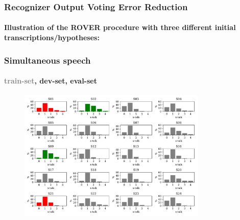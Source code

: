 \documentclass{beamer}
\begin{document}
\begin{frame}
  \frametitle{\textbf{R}ecognizer \textbf{O}utput \textbf{V}oting \textbf{E}rror \textbf{R}eduction}
  \framesubtitle{Illustration of the ROVER procedure with three different initial transcriptions/hypotheses:}
  \begin{figure}
    \centering
    
    \label{fig:rover_procedure}
  \end{figure}

\end{frame}


\begin{frame}
  \frametitle{Simultaneous speech}
  \framesubtitle{\textcolor{gray}{train-set}, \textcolor{tug_green}{dev-set}, \textcolor{tug_red}{eval-set}}
  
  \begin{figure}
    \centering
    \includegraphics[width=0.8\textwidth]{img/xtalk}
  \end{figure}  
 
\end{frame}
\end{document}
